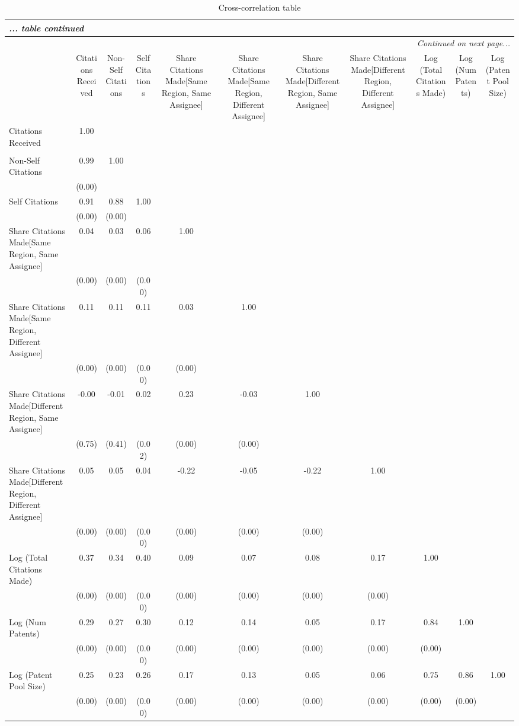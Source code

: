 
\begin{center}
\begin{longtable}{l  c  c  c  c  c  c  c  c  c  c }
\caption{Cross-correlation table\label{corrtable}}\\ 
 \hline\hline
\endfirsthead
\multicolumn{11}{l}{\emph{... table \thetable{} continued}}
 \\ \hline 
\endhead
\hline
\multicolumn{11}{r}{\emph{Continued on next page...}}\\
\endfoot
\hline\hline
\endlastfoot
\multicolumn{1}{c}{Variables} &Citations Received&Non-Self Citations&Self Citations&Share Citations Made[Same Region, Same Assignee]&Share Citations Made[Same Region, Different Assignee]&Share Citations Made[Different Region, Same Assignee]&Share Citations Made[Different Region, Different Assignee]&Log (Total Citations Made)&Log (Num Patents)&Log (Patent Pool Size)\\ \hline
Citations Received&1.00\\
 &\\
Non-Self Citations&0.99&1.00\\
&(0.00) &\\
Self Citations&0.91&0.88&1.00\\
&(0.00)&(0.00) &\\
Share Citations Made[Same Region, Same Assignee]&0.04&0.03&0.06&1.00\\
&(0.00)&(0.00)&(0.00) &\\
Share Citations Made[Same Region, Different Assignee]&0.11&0.11&0.11&0.03&1.00\\
&(0.00)&(0.00)&(0.00)&(0.00) &\\
Share Citations Made[Different Region, Same Assignee]&-0.00&-0.01&0.02&0.23&-0.03&1.00\\
&(0.75)&(0.41)&(0.02)&(0.00)&(0.00) &\\
Share Citations Made[Different Region, Different Assignee]&0.05&0.05&0.04&-0.22&-0.05&-0.22&1.00\\
&(0.00)&(0.00)&(0.00)&(0.00)&(0.00)&(0.00) &\\
Log (Total Citations Made)&0.37&0.34&0.40&0.09&0.07&0.08&0.17&1.00\\
&(0.00)&(0.00)&(0.00)&(0.00)&(0.00)&(0.00)&(0.00) &\\
Log (Num Patents)&0.29&0.27&0.30&0.12&0.14&0.05&0.17&0.84&1.00\\
&(0.00)&(0.00)&(0.00)&(0.00)&(0.00)&(0.00)&(0.00)&(0.00) &\\
Log (Patent Pool Size)&0.25&0.23&0.26&0.17&0.13&0.05&0.06&0.75&0.86&1.00\\
&(0.00)&(0.00)&(0.00)&(0.00)&(0.00)&(0.00)&(0.00)&(0.00)&(0.00)\\
\end{longtable}
\end{center}
